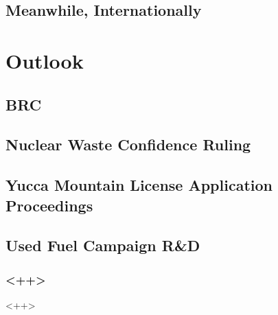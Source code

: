 \documentclass{beamer}
\begin{document}
\subsection{Meanwhile, Internationally}

\section{Outlook}
\subsection{BRC}

\subsection{Nuclear Waste Confidence Ruling}

\subsection{Yucca Mountain License Application Proceedings}

\subsection{Used Fuel Campaign R\&D}



\begin{frame}[<+ctb!+>]
  \frametitle{<++>}
\end{frame}<++>

\end{document}
